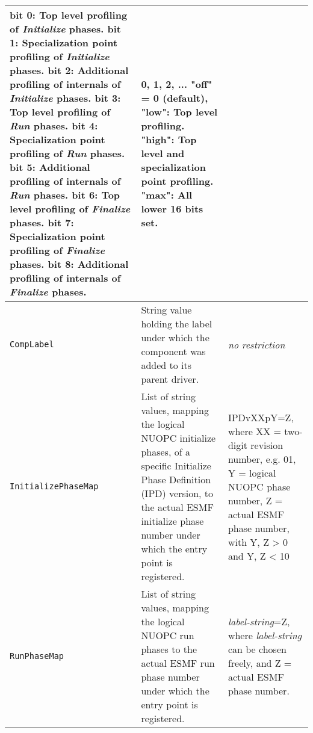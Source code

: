 \begin{longtable}{|p{}|p{}|p{}|}
                       {\bf bit 0}: Top level profiling of {\em Initialize} phases.\newline
                       {\bf bit 1}: Specialization point profiling of {\em Initialize} phases.\newline
                       {\bf bit 2}: Additional profiling of internals of {\em Initialize} phases.\newline
                       {\bf bit 3}: Top level profiling of {\em Run} phases.\newline
                       {\bf bit 4}: Specialization point profiling of {\em Run} phases.\newline
                       {\bf bit 5}: Additional profiling of internals of {\em Run} phases.\newline
                       {\bf bit 6}: Top level profiling of {\em Finalize} phases.\newline
                       {\bf bit 7}: Specialization point profiling of {\em Finalize} phases.\newline
                       {\bf bit 8}: Additional profiling of internals of {\em Finalize} phases.\newline
                     & 0, 1, 2, ... \newline
                       "off" = 0 (default), \newline
                       "low": Top level profiling. \newline
                       "high": Top level and specialization point profiling. \newline
                       "max": All lower 16 bits set.\\ \hline
     {\tt CompLabel} & String value holding the label under which the component was added to its parent driver.& {\em no restriction}\\ \hline
     {\tt InitializePhaseMap} & List of string values, mapping the logical NUOPC initialize phases, of a specific Initialize Phase Definition (IPD) version, to the actual ESMF initialize phase number under which the entry point is registered.& IPDvXXpY=Z, where XX = two-digit revision number, e.g. 01, Y = logical NUOPC phase number, Z = actual ESMF phase number, with Y, Z > 0 and Y, Z < 10 \\ \hline
     {\tt RunPhaseMap} & List of string values, mapping the logical NUOPC run phases to the actual ESMF run phase number under which the entry point is registered.& {\em label-string}=Z, where {\em label-string} can be chosen freely, and Z = actual ESMF phase number. \\ \hline

\end{longtable}
